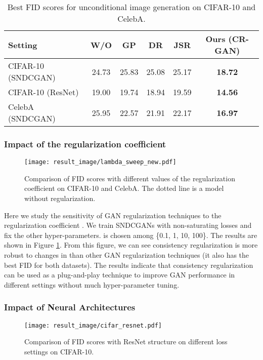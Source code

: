 \documentclass{article} \usepackage{iclr2020_conference,times}
\begin{document}
\begin{table}[t]
\centering
\begin{tabular}{l|ccccc}
 \hline
Setting   & W/O &  GP & DR & JSR  & Ours (CR-GAN) \\ 
\hline
 CIFAR-10 (SNDCGAN)  & 24.73 & 25.83  & 25.08  & 25.17   & \textbf{18.72} \\
  CIFAR-10 (ResNet)  &19.00 & 19.74  & 18.94  & 19.59 &   \textbf{14.56}\\ 
 \hline
 CelebA (SNDCGAN)  & 25.95 & 22.57  & 21.91 &  22.17 & \textbf{16.97}\\
 
 
 \hline \hline
\end{tabular}
\caption{Best FID scores for unconditional image generation on CIFAR-10 and CelebA.
} 
\label{tab:main_comparison}
\end{table}


\subsubsection{Impact of the regularization coefficient}

\begin{figure}[t]
    \centering
    \texttt{[image: result\_image/lambda\_sweep\_new.pdf]}
\caption{
    Comparison of FID scores with different values of the regularization coefficient  
    on CIFAR-10 and CelebA. The dotted line is a model without regularization.
    }
    \label{fig:lambda_sweep}
\end{figure}

Here we study the sensitivity of GAN regularization techniques to the regularization coefficient .
We train SNDCGANs with non-saturating losses and fix the other hyper-parameters.
 is chosen among \{0.1, 1, 10, 100\}.
The results are shown in Figure \ref{fig:lambda_sweep}.
From this figure, we can see consistency regularization is more robust to changes in  than other
GAN regularization techniques (it also has the best FID for both datasets).
The results indicate that consistency regularization can be used as a plug-and-play technique
to improve GAN performance in different settings without much hyper-parameter tuning. 



\subsubsection{Impact of Neural Architectures}

\begin{figure}[t]
    \centering
    \texttt{[image: result\_image/cifar\_resnet.pdf]}
    \caption{
    Comparison of FID scores with ResNet structure on different loss settings on CIFAR-10. 
    }
    \label{fig:resnet_loss}
\end{figure}
\end{document}
